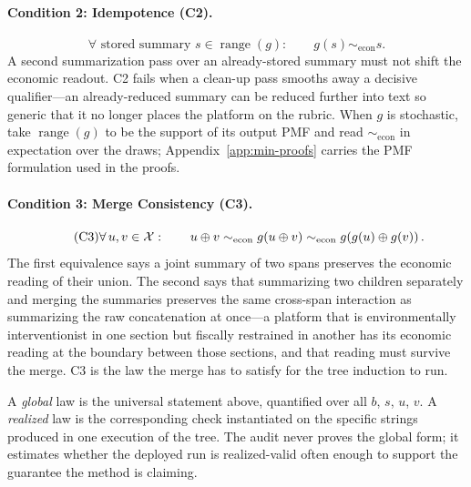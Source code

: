 \paragraph{Condition 2: Idempotence (C2).}
\begin{equation}\tag{C2}\label{eq:leaf_idempotence}
    \forall\text{ stored summary } s \in \operatorname{range}(g) : \qquad
    g(s) \sim_{\mathrm{econ}} s.
\end{equation}
A second summarization pass over an already-stored summary must not shift
the economic readout. C2 fails when a clean-up pass smooths away a
decisive qualifier---an already-reduced summary can be reduced further
into text so generic that it no longer places the platform on the rubric.
When $g$ is stochastic, take $\operatorname{range}(g)$ to be the
support of its output PMF and read $\sim_{\mathrm{econ}}$ in
expectation over the draws; Appendix~\ref{app:min-proofs} carries the
PMF formulation used in the proofs.

\paragraph{Condition 3: Merge Consistency (C3).}
\begin{equation}\tag{C3}\label{eq:leaf_compatibility}
    \forall\, u, v \in \mathcal{X} : \qquad
    u \oplus v
    \sim_{\mathrm{econ}} g(u \oplus v)
    \sim_{\mathrm{econ}} g\!\left(g(u) \oplus g(v)\right).
\end{equation}
The first equivalence says a joint summary of two spans preserves the
economic reading of their union. The second says that summarizing two
children separately and merging the summaries preserves the same
cross-span interaction as summarizing the raw concatenation at once---a
platform that is environmentally interventionist in one section but
fiscally restrained in another has its economic reading at the boundary
between those sections, and that reading must survive the merge. C3 is
the law the merge has to satisfy for the tree induction to run.

A \emph{global} law is the universal statement above, quantified over all
$b$, $s$, $u$, $v$. A \emph{realized} law is the corresponding check
instantiated on the specific strings produced in one execution of the
tree. The audit never proves the global form; it estimates whether the
deployed run is realized-valid often enough to support the guarantee the
method is claiming.

